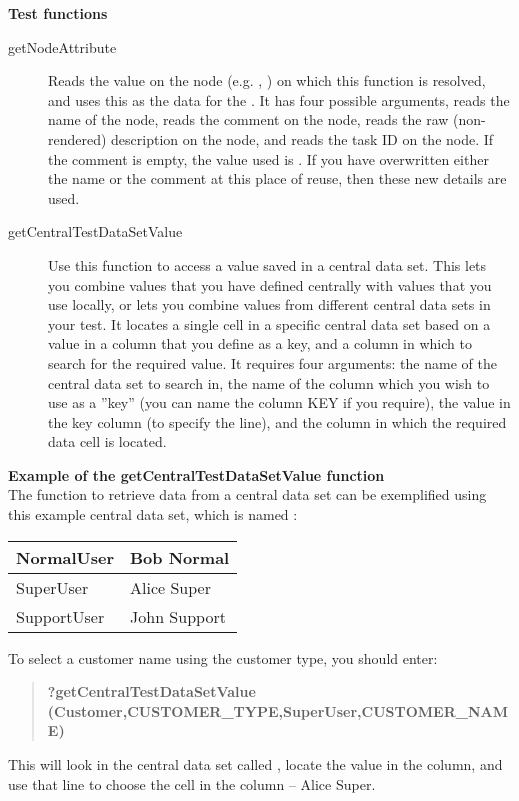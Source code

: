 \textbf{Test functions}\\
\begin{description}
\item [getNodeAttribute]{Reads the value on the node (e.g. \gdcase{}, \gdstep{}) on which this function is resolved, and uses this as the data for the \gdstep{}. It has four possible arguments,  reads the name of the node,  reads the comment on the node,  reads the raw (non-rendered) description on the node, and  reads the task ID on the node. If the comment is empty, the value used is . If you have overwritten either the name or the comment at this place of reuse, then these new details are used.} 
\item [getCentralTestDataSetValue]{Use this function to access a value saved in a central data set. This lets you combine values that you have defined centrally with values that you use locally, or lets you combine values from different central data sets in your test. It locates a single cell in a specific central data set based on a value in a column that you define as a key, and a column in which to search for the required value. It requires four arguments: the name of the central data set to search in, the name of the column which you wish to use as a ''key'' (you can name the column KEY if you require), the value in the key column (to specify the line), and the column in which the required data cell is located.}
\end{description}

\textbf{Example of the getCentralTestDataSetValue function}\\
The function to retrieve data from a central data set can be exemplified using this example central data set, which is named :

\begin{supertabular}{|p{6.0cm}p{6.0cm}|}
\hline
NormalUser & Bob Normal\\
\hline
SuperUser & Alice Super\\
\hline
SupportUser & John Support \\
\hline
\end{supertabular}

 To select a customer name using the customer type, you should enter:
\begin{quote}
\textbf{?getCentralTestDataSetValue\\
(Customer,CUSTOMER\_TYPE,SuperUser,CUSTOMER\_NAME)}
\end{quote}
This will look in the central data set called , locate the value  in the  column, and use that line to choose the cell in the  column -- Alice Super. 

